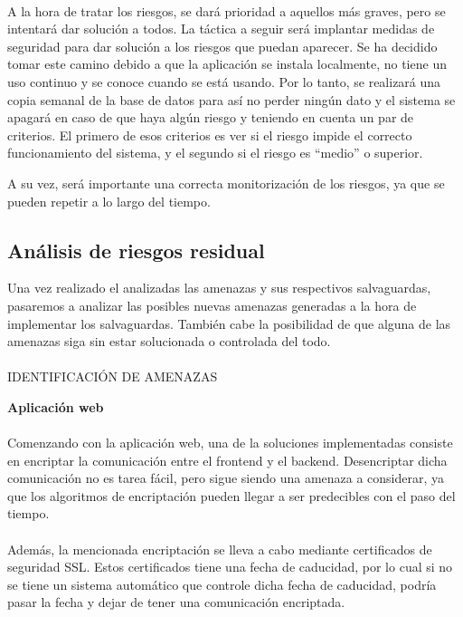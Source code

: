\paragraph{}
A la hora de tratar los riesgos, se dará prioridad a aquellos más graves, pero se intentará dar solución a todos. La táctica a seguir será implantar medidas de seguridad para dar solución a los riesgos que puedan aparecer. Se ha decidido tomar este camino debido a que la aplicación se instala localmente, no tiene un uso continuo y se conoce cuando se está usando. Por lo tanto, se realizará una copia semanal de la base de datos para así no perder ningún dato y el sistema se apagará en caso de que haya algún riesgo y teniendo en cuenta un par de criterios. El primero de esos criterios es ver si el riesgo impide el correcto funcionamiento del sistema, y el segundo si el riesgo es “medio” o superior.

A su vez, será importante una correcta monitorización de los riesgos, ya que se pueden repetir a lo largo del tiempo.

\subsection{Análisis de riesgos residual}

Una vez realizado el analizadas las amenazas y sus respectivos salvaguardas, pasaremos a analizar las posibles nuevas amenazas generadas a la hora de implementar los salvaguardas. También cabe la posibilidad de que alguna de las amenazas siga sin estar solucionada o controlada del todo.
\paragraph{}
IDENTIFICACIÓN DE AMENAZAS

\textbf{Aplicación web}
\paragraph{}
Comenzando con la aplicación web, una de la soluciones implementadas consiste en encriptar la comunicación entre el frontend y el backend. Desencriptar dicha comunicación no es tarea fácil, pero sigue siendo una amenaza a considerar, ya que los algoritmos de encriptación pueden llegar a ser predecibles con el paso del tiempo.
\paragraph{}
Además, la mencionada encriptación se lleva a cabo mediante certificados de seguridad SSL. Estos certificados tiene una fecha de caducidad, por lo cual si no se tiene un sistema automático que controle dicha fecha de caducidad, podría pasar la fecha y dejar de tener una comunicación encriptada.
